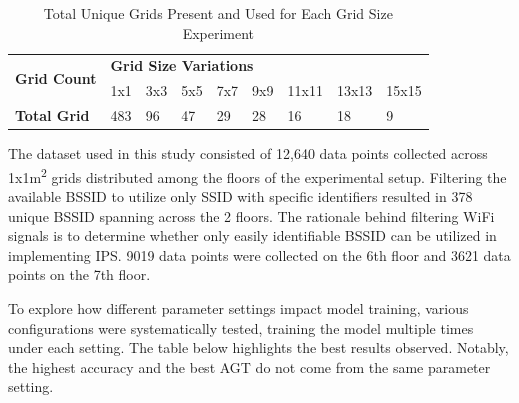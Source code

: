 \documentclass[runningheads]{llncs}
\begin{document}
\vspace{-10pt}
\begin{table}[htbp]
	\caption{Total Unique Grids Present and Used for Each Grid Size Experiment}
	\label{tab:grid_size_variations}
	\centering
	\begin{tabular}{|l|l|l|l|l|l|l|l|l|} 
		\hline
		\multirow{2}{*}{\textbf{Grid Count }} & \multicolumn{8}{l|}{\textbf{Grid Size Variations}}   \\ 
		\cline{2-9}
		& 1x1 & 3x3 & 5x5 & 7x7 & 9x9 & 11x11 & 13x13 & 15x15  \\ 
		\hline
		\textbf{Total Grid}                   & 483 & 96  & 47  & 29  & 28  & 16    & 18    & 9      \\
		\hline
	\end{tabular}
\end{table}

The dataset used in this study consisted of 12,640 data points collected across 1x1m\textsuperscript{2} grids distributed among the floors of the experimental setup. Filtering the available BSSID to utilize only SSID with specific identifiers resulted in 378 unique BSSID spanning across the 2 floors. The rationale behind filtering WiFi signals is to determine whether only easily identifiable BSSID can be utilized in implementing IPS. 9019 data points were collected on the 6th floor and 3621 data points on the 7th floor.

To explore how different parameter settings impact model training, various configurations were systematically tested, training the model multiple times under each setting. The table below highlights the best results observed. Notably, the highest accuracy and the best AGT do not come from the same parameter setting.
\end{document}
